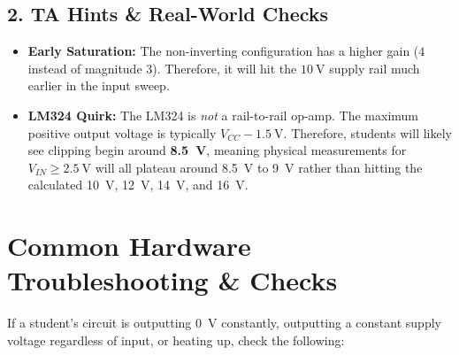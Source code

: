 \documentclass[11pt]{article}
\begin{document}
\subsection*{2. TA Hints \& Real-World Checks}
\begin{itemize}
  \item \textbf{Early Saturation:} The non-inverting configuration has a higher gain ($4$ instead of magnitude $3$). Therefore, it will hit the $\SI{+10}{\volt}$ supply rail much earlier in the input sweep.
  \item \textbf{LM324 Quirk:} The LM324 is \textit{not} a rail-to-rail op-amp. The maximum positive output voltage is typically $V_{CC} - \SI{1.5}{\volt}$. Therefore, students will likely see clipping begin around \textbf{\SI{+8.5}{\volt}}, meaning physical measurements for $V_{IN} \geq \SI{2.5}{\volt}$ will all plateau around \SI{8.5}{\volt} to \SI{9}{\volt} rather than hitting the calculated \SI{10}{\volt}, \SI{12}{\volt}, \SI{14}{\volt}, and \SI{16}{\volt}.
\end{itemize}

\vspace{0.2in}
\section*{Common Hardware Troubleshooting \& Checks}

If a student's circuit is outputting \SI{0}{\volt} constantly, outputting a constant supply voltage regardless of input, or heating up, check the following:
\end{document}
